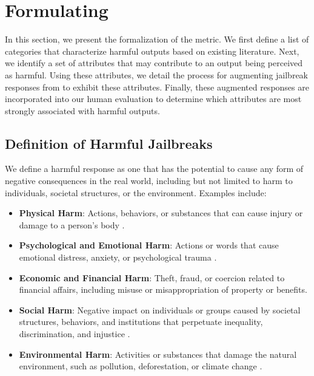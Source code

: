 \section{Formulating \harmscore}
\label{app:attributes}

In this section, we present the formalization of the \harmscore metric. 
We first define a list of categories that characterize harmful outputs based on existing literature.
Next, we identify a set of attributes that may contribute to an output being perceived as harmful.
Using these attributes, we detail the process for augmenting jailbreak responses from \harmbench to exhibit these attributes. 
Finally, these augmented responses are incorporated into our human evaluation to determine which attributes are most strongly associated with harmful outputs.


\subsection{Definition of Harmful Jailbreaks}
\label{app:harm_def}

We define a harmful response as one that has the potential to cause any form of negative consequences in the real world, including but not limited to harm to individuals, societal structures, or the environment. 
Examples include:

\begin{itemize}[itemsep=0pt, topsep=0pt, partopsep=0pt]
    \item \textbf{Physical Harm}:
    Actions, behaviors, or substances that can cause injury or damage to a person's body \citep{harrosh2012identifying}.
    \item \textbf{Psychological and Emotional Harm}: 
    Actions or words that cause emotional distress, anxiety, or psychological trauma \citep{harrosh2012identifying}.
    \item \textbf{Economic and Financial Harm}: 
    Theft, fraud, or coercion related to financial affairs, including misuse or misappropriation of property or benefits.
    \item \textbf{Social Harm}:
    Negative impact on individuals or groups caused by societal structures, behaviors, and institutions that perpetuate inequality, discrimination, and injustice \citep{pemberton2015defining}.
    \item \textbf{Environmental Harm}: 
    Activities or substances that damage the natural environment, such as pollution, deforestation, or climate change \citep{bowman2002environmental}. 
\end{itemize}

